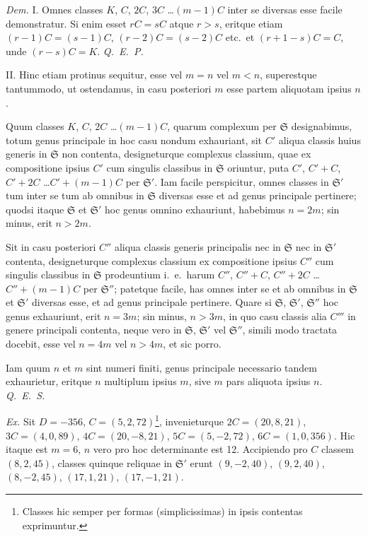 \documentclass[12pt,a4paper]{article}
\theoremstyle{plain}
\theoremstyle{definition}
\theoremstyle{remark}
\begin{document}
\textit{Dem.} I. Omnes classes $K$, $C$, $2C$, $3C$ \ldots $(m-1)C$ inter se diversas esse facile demonstratur. Si enim esset $rC = sC$ atque $r > s$, eritque etiam $(r-1)C = (s-1)C$, $(r-2)C = (s-2)C$ etc.~et $(r+1-s)C = C$, unde $(r-s)C = K$. \textit{Q.~E.~P.}

II. Hinc etiam protinus sequitur, esse vel $m = n$ vel $m < n$, superestque tantummodo, ut ostendamus, in casu posteriori $m$ esse partem aliquotam ipsius $n$.

Quum classes $K$, $C$, $2C$ \ldots $(m-1)C$, quarum complexum per $\mathfrak{S}$ designabimus, totum genus principale in hoc casu nondum exhauriant, sit $C'$ aliqua classis huius generis in $\mathfrak{S}$ non contenta, designeturque complexus classium, quae ex compositione ipsius $C'$ cum singulis classibus in $\mathfrak{S}$ oriuntur, puta $C'$, $C'+C$, $C'+2C$ \ldots $C'+(m-1)C$ per $\mathfrak{S}'$. Iam facile perspicitur, omnes classes in $\mathfrak{S}'$ tum inter se tum ab omnibus in $\mathfrak{S}$ diversas esse et ad genus principale pertinere; quodsi itaque $\mathfrak{S}$ et $\mathfrak{S}'$ hoc genus omnino exhauriunt, habebimus $n = 2m$; sin minus, erit $n > 2m$.

Sit in casu posteriori $C''$ aliqua classis generis principalis nec in $\mathfrak{S}$ nec in $\mathfrak{S}'$ contenta, designeturque complexus classium ex compositione ipsius $C''$ cum singulis classibus in $\mathfrak{S}$ prodeuntium i.~e.~harum $C''$, $C''+C$, $C''+2C$ \ldots $C''+(m-1)C$ per $\mathfrak{S}''$; patetque facile, has omnes inter se et ab omnibus in $\mathfrak{S}$ et $\mathfrak{S}'$ diversas esse, et ad genus principale pertinere. Quare si $\mathfrak{S}$, $\mathfrak{S}'$, $\mathfrak{S}''$ hoc genus exhauriunt, erit $n = 3m$; sin minus, $n > 3m$, in quo casu classis alia $C'''$ in genere principali contenta, neque vero in $\mathfrak{S}$, $\mathfrak{S}'$ vel $\mathfrak{S}''$, simili modo tractata docebit, esse vel $n = 4m$ vel $n > 4m$, et sic porro.

Iam quum $n$ et $m$ sint numeri finiti, genus principale necessario tandem exhaurietur, eritque $n$ multiplum ipsius $m$, sive $m$ pars aliquota ipsius $n$. \textit{Q.~E.~S.}

\textit{Ex.} Sit $D = -356$, $C = (5, 2, 72)$\footnote{Classes hic semper per formas (simplicissimas) in ipsis contentas exprimuntur.}, invenieturque $2C = (20, 8, 21)$, $3C = (4, 0, 89)$, $4C = (20, -8, 21)$, $5C = (5, -2, 72)$, $6C = (1, 0, 356)$. Hic itaque est $m = 6$, $n$ vero pro hoc determinante est 12. Accipiendo pro $C$ classem $(8, 2, 45)$, classes quinque reliquae in $\mathfrak{S}'$ erunt $(9, -2, 40)$, $(9, 2, 40)$, $(8, -2, 45)$, $(17, 1, 21)$, $(17, -1, 21)$.
\end{document}
